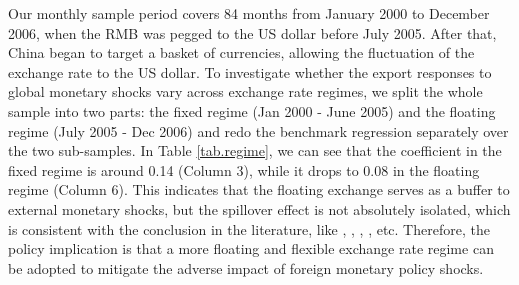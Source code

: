 Our monthly sample period covers 84 months from January 2000 to December 2006, when the RMB was pegged to the US dollar before July 2005. After that, China began to target a basket of currencies, allowing the fluctuation of the exchange rate to the US dollar. To investigate whether the export responses to global monetary shocks vary across exchange rate regimes, we split the whole sample into two parts: the fixed regime (Jan 2000 - June 2005) and the floating regime (July 2005 - Dec 2006) and redo the benchmark regression separately over the two sub-samples. In Table \ref{tab.regime}, we can see that the coefficient in the fixed regime is around 0.14 (Column 3), while it drops to 0.08 in the floating regime (Column 6). This indicates that the floating exchange serves as a buffer to external monetary shocks, but the spillover effect is not absolutely isolated, which is consistent with the conclusion in the literature, like \cite{shambaugh2004effect}, \cite{klein2012exchange}, \cite{georgiadis2016determinants}, \cite{dedola2017if}, etc. Therefore, the policy implication is that a more floating and flexible exchange rate regime can be adopted to mitigate the adverse impact of foreign monetary policy shocks.


